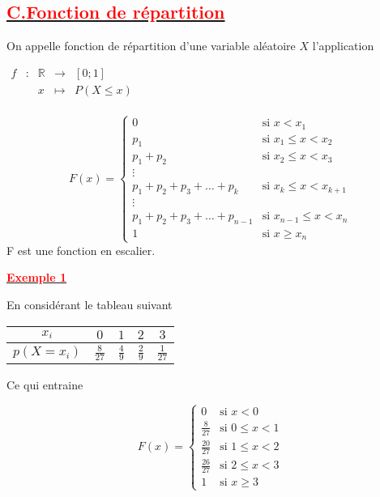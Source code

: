 \documentclass[12pt]{article}
\begin{document}
\subsection*{\underline{\textbf{\textcolor{red}{C.Fonction de répartition}}}}
On appelle fonction de répartition d'une variable aléatoire $X$ l'application

$\begin{array}{ccccc}
f & : & \mathbb{R} & \rightarrow & [0;1] \\
 & & x & \mapsto & P(X \leq x) \\
\end{array}$

\begin{equation*}
F(x)=\begin{cases}
0 & \text{si } x < x_{1}\\
p_{1} & \text{si } x_{1} \leq x < x_{2}\\
p_{1} + p_{2} & \text{si } x_{2} \leq x < x_{3}\\
\vdots \\
p_{1} + p_{2} + p_{3} + \ldots + p_{k} & \text{si } x_{k} \leq x < x_{k+1}\\
\vdots \\
p_{1} + p_{2} + p_{3} + \ldots + p_{n-1} & \text{si } x_{n-1} \leq x < x_{n}\\
1 & \text{si } x \geq x_{n}
\end{cases}
\end{equation*}
F  est une fonction en escalier.

\underline{\textbf{\textcolor{red}{Exemple 1}}}

En considérant le tableau suivant

\begin{tabular}{|c|c|c|c|c|}
\hline
$x_{i}$ & $0$ & $1$ & $2$ & $3$\\
\hline
$p(X = x_{i}) $ &$\frac{8}{27}$&$\frac{4}{9}$&$\frac{2}{9}$&$\frac{1}{27}$\\
\hline
\end{tabular}

Ce qui entraine

\begin{equation*}
F(x)=\begin{cases}
0 & \text{si } x < 0\\
\frac{8}{27} & \text{si } 0 \leq x < 1\\
\frac{20}{27} & \text{si } 1 \leq x < 2\\
\frac{26}{27} & \text{si } 2 \leq x < 3\\
1 & \text{si } x \geq 3
\end{cases}
\end{equation*}
\end{document}
